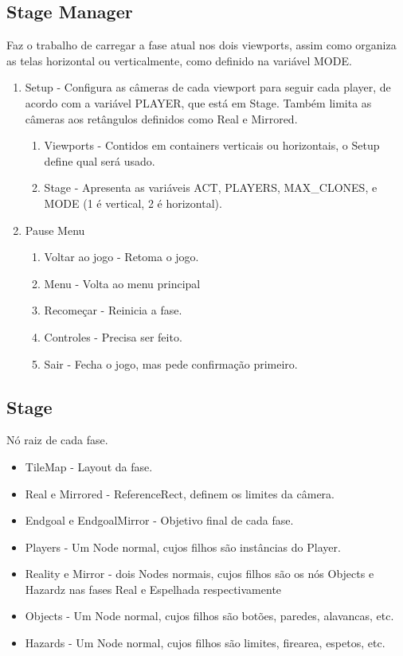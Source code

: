 \documentclass[a4paper, 11pt]{article}
\begin{document}
		\subsection{Stage Manager} 
			Faz o trabalho de carregar a fase atual nos dois viewports, assim como organiza as telas horizontal ou verticalmente, como definido na variável MODE.
			\begin{enumerate}
			\item Setup - Configura as câmeras de cada viewport para seguir cada player, de acordo com a variável PLAYER, que está em Stage. Também limita as câmeras aos retângulos definidos como Real e Mirrored.
				\begin{enumerate}
				\item Viewports - Contidos em containers verticais ou horizontais, o Setup define qual será usado.
				\item Stage - Apresenta as variáveis ACT, PLAYERS, MAX\_CLONES, e MODE (1 é vertical, 2 é horizontal).
				\end{enumerate}
			\item Pause Menu
				\begin{enumerate}
				\item Voltar ao jogo - Retoma o jogo.
				\item Menu - Volta ao menu principal
				\item Recomeçar - Reinicia a fase.
				\item Controles - Precisa ser feito.
				\item Sair - Fecha o jogo, mas pede confirmação primeiro.
				\end{enumerate}
			\end{enumerate}

		\subsection{Stage}
			Nó raiz de cada fase.
			\begin{itemize}
				\item TileMap - Layout da fase.
				\item Real e Mirrored - ReferenceRect, definem os limites da câmera.
				\item Endgoal e EndgoalMirror - Objetivo final de cada fase.
				\item Players - Um Node normal, cujos filhos são instâncias do Player.
				\item Reality e Mirror - dois Nodes normais, cujos filhos são os nós Objects e Hazardz nas fases Real e Espelhada respectivamente
				\item Objects - Um Node normal, cujos filhos são botões, paredes, alavancas, etc.
				\item Hazards - Um Node normal, cujos filhos são limites, firearea, espetos, etc.
			\end{itemize}
\end{document}
